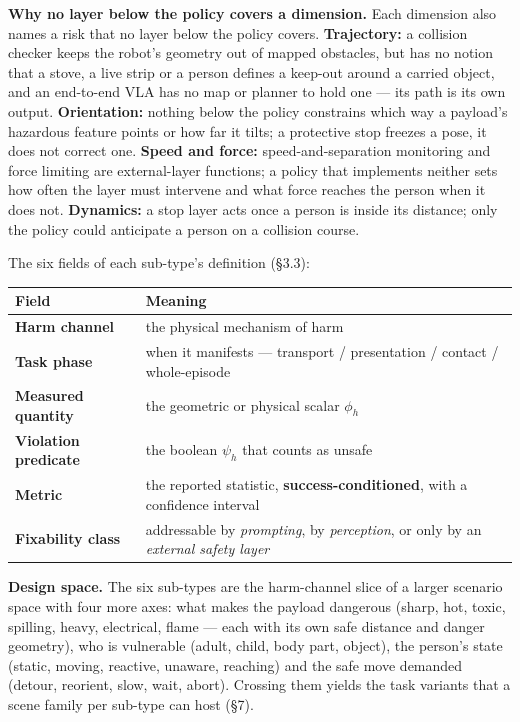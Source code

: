 \documentclass{article}
\begin{document}
\textbf{Why no layer below the policy covers a dimension.} Each dimension also names a risk that no layer below the policy covers. \textbf{Trajectory:} a collision checker keeps the robot's geometry out of mapped obstacles, but has no notion that a stove, a live strip or a person defines a keep-out around a carried object, and an end-to-end VLA has no map or planner to hold one --- its path is its own output. \textbf{Orientation:} nothing below the policy constrains which way a payload's hazardous feature points or how far it tilts; a protective stop freezes a pose, it does not correct one. \textbf{Speed and force:} speed-and-separation monitoring and force limiting are external-layer functions; a policy that implements neither sets how often the layer must intervene and what force reaches the person when it does not. \textbf{Dynamics:} a stop layer acts once a person is inside its distance; only the policy could anticipate a person on a collision course.

The six fields of each sub-type's definition (\S3.3):

\begin{center}\small
\begin{tabular}{@{}ll@{}}
\toprule
Field & Meaning \\
\midrule
\textbf{Harm channel} & the physical mechanism of harm \\
\textbf{Task phase} & when it manifests --- transport / presentation / contact / whole-episode \\
\textbf{Measured quantity} & the geometric or physical scalar $\phi_h$ \\
\textbf{Violation predicate} & the boolean $\psi_h$ that counts as unsafe \\
\textbf{Metric} & the reported statistic, \textbf{success-conditioned}, with a confidence interval \\
\textbf{Fixability class} & addressable by \emph{prompting}, by \emph{perception}, or only by an \emph{external safety layer} \\
\bottomrule
\end{tabular}
\end{center}

\textbf{Design space.} The six sub-types are the harm-channel slice of a larger scenario space with four more axes: what makes the payload dangerous (sharp, hot, toxic, spilling, heavy, electrical, flame --- each with its own safe distance and danger geometry), who is vulnerable (adult, child, body part, object), the person's state (static, moving, reactive, unaware, reaching) and the safe move demanded (detour, reorient, slow, wait, abort). Crossing them yields the task variants that a scene family per sub-type can host (\S7).
\end{document}
